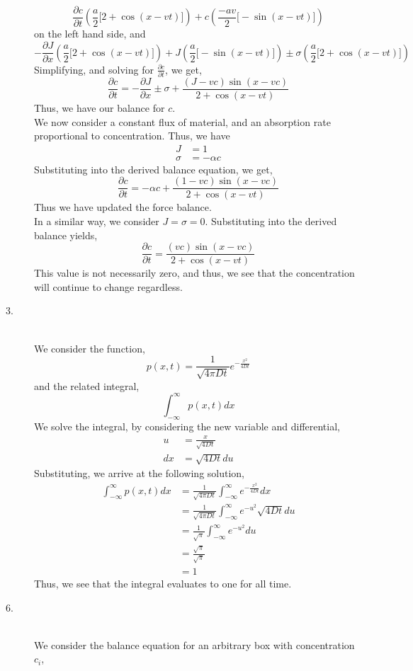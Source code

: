 \documentclass[letterpaper,10pt]{article}
\begin{document}
\begin{description}
\[\frac{\partial c}{\partial t}(\frac{a}{2}\big[2+\cos(x-vt)\big])+c(\frac{-av}{2}\big[-\sin(x-vt)\big])\]
on the left hand side, and
\[-\frac{\partial J}{\partial x}(\frac{a}{2}\big[2+\cos(x-vt)\big])+J(\frac{a}{2}\big[-\sin(x-vt)\big])\pm \sigma (\frac{a}{2}\big[2+\cos(x-vt)\big])\]
Simplifying, and solving for $\frac{\partial c}{\partial t}$, we get,
\[\frac{\partial c}{\partial t}=-\frac{\partial J}{\partial x}\pm \sigma + \frac{(J-vc)\sin(x-vc)}{2+\cos(x-vt)}\]
Thus, we have our balance for $c$.\\
We now consider a constant flux of material, and an absorption rate proportional to concentration. Thus, we have
\begin{align*}
J&=1\\
\sigma&=-\alpha c
\end{align*} 
Substituting into the derived balance equation, we get,
\[\frac{\partial c}{\partial t}=-\alpha c+ \frac{(1-vc)\sin(x-vc)}{2+\cos(x-vt)}\]
Thus we have updated the force balance.\\
In a similar way, we consider $J=\sigma=0$.  Substituting into the derived balance yields,
\[\frac{\partial c}{\partial t}=\frac{(vc)\sin(x-vc)}{2+\cos(x-vt)}\]
This value is not necessarily zero, and thus, we see that the concentration will continue to change regardless.
\item[3.] \hfill \\
We consider the function,
\[p(x,t)=\frac{1}{\sqrt{4\pi Dt}}e^{-\frac{x^2}{4Dt}}\]
and the related integral, 
\[\int_{-\infty}^{\infty}p(x,t)dx\]
We solve the integral, by considering the new variable and differential,
\begin{align*}
u&=\frac{x}{\sqrt{4Dt}}\\
dx&=\sqrt{4Dt}du
\end{align*}
Substituting, we arrive at the following solution,
\begin{align*}
\int_{-\infty}^{\infty}p(x,t)dx&=\frac{1}{\sqrt{4\pi Dt}}\int_{-\infty}^{\infty}e^{-\frac{x^2}{4Dt}}dx\\
&=\frac{1}{\sqrt{4\pi Dt}}\int_{-\infty}^{\infty}e^{-u^2}\sqrt{4Dt}du\\
&=\frac{1}{\sqrt{\pi}}\int_{-\infty}^{\infty}e^{-u^2}du\\
&=\frac{\sqrt{\pi}}{\sqrt{\pi}}\\
&=1
\end{align*}
Thus, we see that the integral evaluates to one for all time.\
\item[6.]\hfill\\
We consider the balance equation for an arbitrary box with concentration $c_i$,

\end{description}
\end{document}
